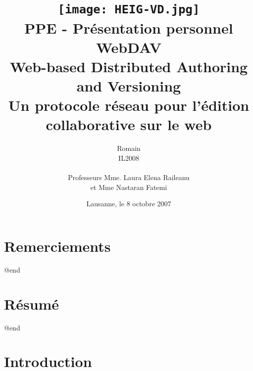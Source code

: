 \documentclass[a4paper, 11pt]{article}
\title{\texttt{[image: HEIG-VD.jpg]} \\ \vspace{4cm}
\small{PPE - Présentation personnel} \\ \vspace{2cm}
\huge{WebDAV} \\ \vspace{1cm} 
Web-based Distributed Authoring and Versioning \\ 
\small{Un protocole réseau pour l'édition collaborative sur le web}}
\author{Romain \bsc{de
Wolff} \\ IL2008 \\ \vspace{2cm} \\ Professeurs Mme. Laura Elena Raileanu \\ et Mme Nastaran Fatemi \vspace{2cm} 
}
\date{Lausanne, le 8 octobre 2007}  %
\begin{document}
\maketitle
\thispagestyle{empty} %
\newpage
 \setcounter{page}{1} 

{\setlength{\baselineskip}{1.2\baselineskip}
\parskip=12pt

\section*{Remerciements} 

@end

\section*{Résumé}

@end

\newpage
\tableofcontents
\newpage
 \setcounter{page}{1} 

\section{Introduction}


}
\end{document}
